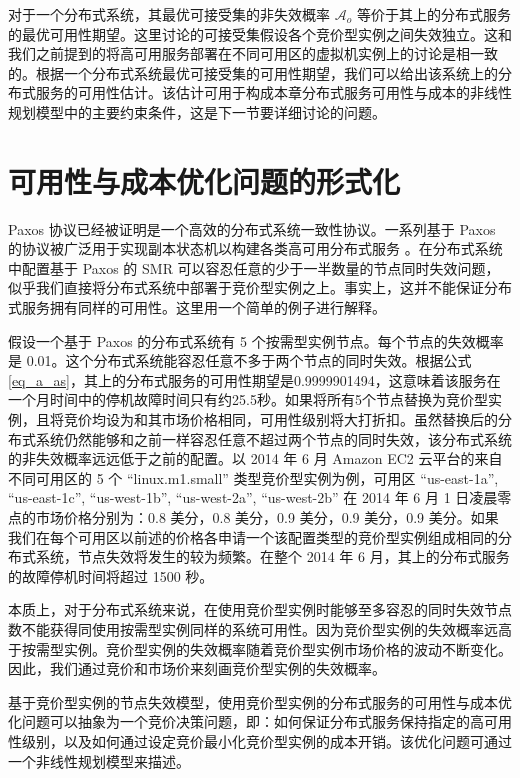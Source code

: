 对于一个分布式系统，其最优可接受集的非失效概率 $\mathcal{A}_{o}$ 等价于其上的分布式服务的最优可用性期望。这里讨论的可接受集假设各个竞价型实例之间失效独立。这和我们之前提到的将高可用服务部署在不同可用区的虚拟机实例上的讨论是相一致的。根据一个分布式系统最优可接受集的可用性期望，我们可以给出该系统上的分布式服务的可用性估计。该估计可用于构成本章分布式服务可用性与成本的非线性规划模型中的主要约束条件，这是下一节要详细讨论的问题。

\section{可用性与成本优化问题的形式化}
\label{jupiter-formulation}
Paxos \cite{lamport2001paxos}协议已经被证明是一个高效的分布式系统一致性协议。一系列基于 Paxos 的协议被广泛用于实现副本状态机以构建各类高可用分布式服务 \cite{Bolosky:2011:PRS:1972457.1972472, Burrows:2006:CLS:1298455.1298487, Mu:2014:PME:2600212.2600218}。在分布式系统中配置基于 Paxos 的 SMR 可以容忍任意的少于一半数量的节点同时失效问题，似乎我们直接将分布式系统中部署于竞价型实例之上。事实上，这并不能保证分布式服务拥有同样的可用性。这里用一个简单的例子进行解释。

假设一个基于 Paxos 的分布式系统有 5 个按需型实例节点。每个节点的失效概率是 0.01。这个分布式系统能容忍任意不多于两个节点的同时失效。根据公式\eqref{eq_a_as}，其上的分布式服务的可用性期望是0.9999901494，这意味着该服务在一个月时间中的停机故障时间只有约25.5秒。如果将所有5个节点替换为竞价型实例，且将竞价均设为和其市场价格相同，可用性级别将大打折扣。虽然替换后的分布式系统仍然能够和之前一样容忍任意不超过两个节点的同时失效，该分布式系统的非失效概率远远低于之前的配置。以 2014 年 6 月 Amazon EC2 云平台的来自不同可用区的 5 个 ``linux.m1.small'' 类型竞价型实例为例，可用区 ``us-east-1a'', ``us-east-1c'', ``us-west-1b'', ``us-west-2a'', ``us-west-2b'' 在 2014 年 6 月 1 日凌晨零点的市场价格分别为：0.8 美分，0.8 美分，0.9 美分，0.9 美分，0.9 美分。如果我们在每个可用区以前述的价格各申请一个该配置类型的竞价型实例组成相同的分布式系统，节点失效将发生的较为频繁。在整个 2014 年 6 月，其上的分布式服务的故障停机时间将超过 1500 秒。

本质上，对于分布式系统来说，在使用竞价型实例时能够至多容忍的同时失效节点数不能获得同使用按需型实例同样的系统可用性。因为竞价型实例的失效概率远高于按需型实例。竞价型实例的失效概率随着竞价型实例市场价格的波动不断变化。因此，我们通过竞价和市场价来刻画竞价型实例的失效概率。

基于竞价型实例的节点失效模型，使用竞价型实例的分布式服务的可用性与成本优化问题可以抽象为一个竞价决策问题，即：如何保证分布式服务保持指定的高可用性级别，以及如何通过设定竞价最小化竞价型实例的成本开销。该优化问题可通过一个非线性规划模型来描述。

